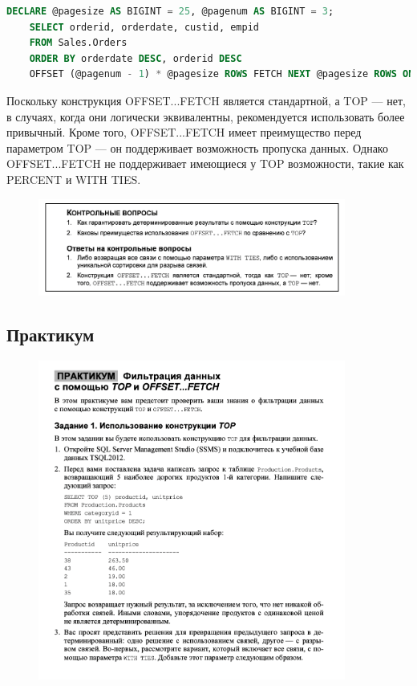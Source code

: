 \begin{lstlisting}[label=lst:funcReturn,  language=sql]
	DECLARE @pagesize AS BIGINT = 25, @pagenum AS BIGINT = 3;
	SELECT orderid, orderdate, custid, empid
	FROM Sales.Orders
	ORDER BY orderdate DESC, orderid DESC
	OFFSET (@pagenum - 1) * @pagesize ROWS FETCH NEXT @pagesize ROWS ONLY;
\end{lstlisting}

Поскольку конструкция OFFSET...FETCH является стандартной, а TOP — нет, в случаях, когда они логически эквивалентны, рекомендуется использовать более привычный. Кроме того, OFFSET...FETCH имеет преимущество перед параметром TOP — он
поддерживает возможность пропуска данных. Однако OFFSET...FETCH не поддерживает имеющиеся у TOP возможности, такие как PERCENT и WITH TIES. 


\begin{figure}[h!]
	\begin{center}
		\includegraphics[width=0.9\textwidth]{img/control10.png}
	\end{center}
	\captionsetup{justification=centering}
\end{figure}

\subsection*{Практикум}


\begin{figure}[h!]
	\begin{center}
		\includegraphics[width=0.9\textwidth]{img/ex3.png}
	\end{center}
	\captionsetup{justification=centering}
\end{figure}

